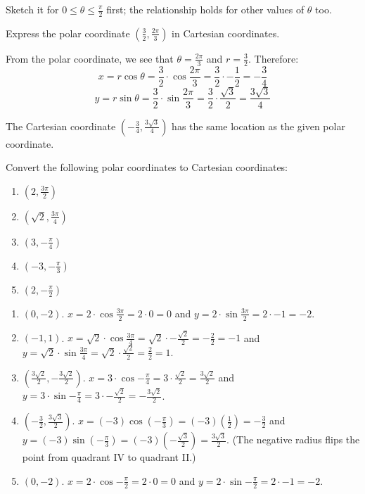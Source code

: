 Sketch it for $0 \leq \theta \leq \frac{\pi}{
2}$ first; the relationship holds for other values of $\theta$ too. 

\begin{Worked}
\begin{Problem}
Express the polar coordinate $(\frac{3}{2}, \frac{2\pi}{3})$ 
in Cartesian coordinates.
\end{Problem}
\begin{Solution}
From the polar coordinate, we see that $\theta = \frac{2\pi
}{3}$ and $r = \frac{3}{2}$. Therefore:
$$x = r\cos{\theta} = \frac{3}{2} \cdot \cos{\frac{2\pi}{3}} = \frac{3}{2} 
\cdot -\frac{1}{2} = -\frac{3}{4}$$
$$y = r\sin{\theta} = \frac{3}{2} \cdot \sin{\frac{2\pi}{3}} = \frac{3}{2} 
\cdot \frac{\sqrt{3}}{2} = \frac{3\sqrt{3}}{4}$$

The Cartesian coordinate $(-\frac{3}{4}, \frac{3\sqrt{3}}{4})$ has the 
same location as the given polar coordinate. 
\end{Solution}
\end{Worked}

\begin{Exercise}[label = convert1]
Convert the following polar coordinates to Cartesian coordinates: 
\begin{enumerate}
\item $(2, \frac{3\pi}{2})$
\item $(\sqrt{2}, \frac{3\pi}{4})$
\item $(3, -\frac{\pi}{4})$
\item $(-3, -\frac{\pi}{3})$
\item $(2, -\frac{\pi}{2})$
\end{enumerate}
\end{Exercise}

\begin{Answer}[ref = convert1]
\begin{enumerate}
\item $(0, -2)$. $x = 2 \cdot \cos{\frac{3\pi}{2}} = 2 \cdot 0 = 0$ and $y = 2 
\cdot \sin{\frac{3\pi}{2}} = 2 \cdot -1 = -2$.
\item $(-1,1)$. $x = \sqrt{2} \cdot \cos{\frac{3\pi}{4}} = \sqrt{2} \cdot - 
\frac{\sqrt{2}}{2} = -\frac{2}{2} = -1$ and $y = \sqrt{2} \cdot \sin{\frac{3
\pi}{4}} = \sqrt{2} \cdot \frac{\sqrt{2}}{2} = \frac{2}{2} = 1$. 
\item $(\frac{3\sqrt{2}}{2}, -\frac{3\sqrt{2}}{2})$. $x = 3 \cdot \cos{-\frac{
\pi}{4}} = 3 \cdot \frac{\sqrt{2}}{2} = \frac{3\sqrt{2}}{2}$ and $y = 3 \cdot 
\sin{-\frac{\pi}{4}} = 3 \cdot -\frac{\sqrt{2}}{2} = -\frac{3\sqrt{2}}{2}$.
\item $(-\frac{3}{2}, \frac{3\sqrt{3}}{2})$. $x = (-3)\cos{(-\frac{\pi}{3})} = (-3)\left(\frac{1}{2}\right) = -\frac{3}{2}$ and $y = (-3)\sin{(-\frac{\pi}{3})} = (-3)\left(-\frac{\sqrt{3}}{2}\right) = \frac{3\sqrt{3}}{2}$. (The negative radius flips the point from quadrant IV to quadrant II.)
\item $(0, -2)$. $x = 2 \cdot \cos{-\frac{\pi}{2}} = 2 \cdot 0 = 0$ and $y = 2 
\cdot \sin{-\frac{\pi}{2}} = 2 \cdot -1 = -2$. 
\end{enumerate}
\end{Answer}

